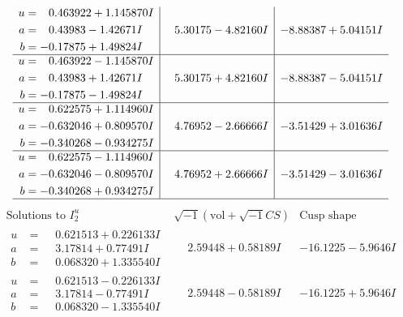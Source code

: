 \documentclass[1p]{elsarticle_modified}
\theoremstyle{definition}
\newcommand{\I}{\sqrt{-1}}
\begin{document}
$$\begin{array}{c|c|c}
\begin{aligned}
u &= \phantom{-}0.463922 + 1.145870 I \\
a &= \phantom{-}0.43983 - 1.42671 I \\
b &= -0.17875 + 1.49824 I\end{aligned}
 & \phantom{-}5.30175 - 4.82160 I & -8.88387 + 5.04151 I \\ \hline\begin{aligned}
u &= \phantom{-}0.463922 - 1.145870 I \\
a &= \phantom{-}0.43983 + 1.42671 I \\
b &= -0.17875 - 1.49824 I\end{aligned}
 & \phantom{-}5.30175 + 4.82160 I & -8.88387 - 5.04151 I \\ \hline\begin{aligned}
u &= \phantom{-}0.622575 + 1.114960 I \\
a &= -0.632046 + 0.809570 I \\
b &= -0.340268 - 0.934275 I\end{aligned}
 & \phantom{-}4.76952 - 2.66666 I & -3.51429 + 3.01636 I \\ \hline\begin{aligned}
u &= \phantom{-}0.622575 - 1.114960 I \\
a &= -0.632046 - 0.809570 I \\
b &= -0.340268 + 0.934275 I\end{aligned}
 & \phantom{-}4.76952 + 2.66666 I & -3.51429 - 3.01636 I\\
 \hline 
 \end{array}$$\newpage$$\begin{array}{c|c|c}  
\text{Solutions to }I^u_{2}& \I (\text{vol} + \sqrt{-1}CS) & \text{Cusp shape}\\
 \hline 
\begin{aligned}
u &= \phantom{-}0.621513 + 0.226133 I \\
a &= \phantom{-}3.17814 + 0.77491 I \\
b &= \phantom{-}0.068320 + 1.335540 I\end{aligned}
 & \phantom{-}2.59448 + 0.58189 I & -16.1225 - 5.9646 I \\ \hline\begin{aligned}
u &= \phantom{-}0.621513 - 0.226133 I \\
a &= \phantom{-}3.17814 - 0.77491 I \\
b &= \phantom{-}0.068320 - 1.335540 I\end{aligned}
 & \phantom{-}2.59448 - 0.58189 I & -16.1225 + 5.9646 I \\ \hline\begin{aligned}

\end{aligned}
\end{array}$$
\end{document}
